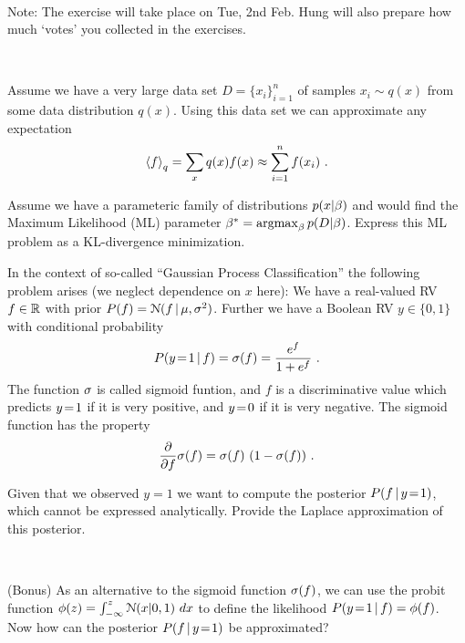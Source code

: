

\renewcommand{\course}{Maths for Intelligent Systems}
\renewcommand{\coursedate}{Summer 2019}

\renewcommand{\exnum}{Exercise 11}

\exercises


\exercisestitle


~

Note: The exercise will take place on Tue, 2nd Feb. Hung will also
prepare how much `votes' you collected in the exercises.

~


Assume we have a very large data set $D=\{ x_i \}_{i=1}^n$ of samples
$x_i \sim q(x)$ from some data distribution $q(x)$. Using this data
set we can approximate any expectation
$$\<f\>_q = \sum_x q(x) f(x) \approx \sum_{i=1}^n f(x_i) ~.$$

Assume we have a parameteric family of distributions $p(x | \b )$ and
would find the Maximum Likelihood (ML) parameter $\b^* = \argmax_\b
p(D|\b)$. Express this ML problem as a KL-divergence minimization.


In the context of so-called ``Gaussian Process Classification'' the
following problem arises (we neglect dependence on $x$ here): We have a
real-valued RV $f\in\RRR$ with prior $P(f)=\NN(f\|\m,\s^2)$. Further
we have a Boolean RV $y\in\{0,1\}$ with conditional probability
$$P(y\=1 \| f) = \s(f) = \frac{e^f}{1+e^f} ~.$$
The function $\s$ is called sigmoid funtion, and $f$ is a
discriminative value which predicts $y\=1$ if it is very positive, and
$y\=0$ if it is very negative. The sigmoid function has the property
$$\frac{\del}{\del f} \s(f) = \s(f)~ (1-\s(f)) ~.$$

Given that we observed $y=1$ we want to compute the posterior $P(f\|
y\=1 )$, which cannot be expressed analytically. Provide the Laplace
approximation of this posterior.

~

(Bonus) As an alternative to the sigmoid function $\s(f)$, we can use
the probit function $\phi(z) = \int_{-\infty}^z \NN(x|0,1)~ dx$ to
define the likelihood $P(y\=1 \| f) = \phi(f)$. Now how can the
posterior $P(f\|y\=1)$ be approximated?

